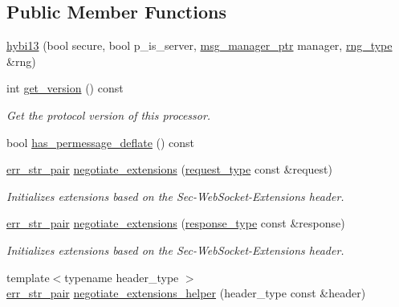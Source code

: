 \subsection*{Public Member Functions}
\begin{DoxyCompactItemize}
\item 
\hyperlink{classwebsocketpp_1_1processor_1_1hybi13_af07830f45e2733bd75db70fe951416cf}{hybi13} (bool secure, bool p\+\_\+is\+\_\+server, \hyperlink{classwebsocketpp_1_1processor_1_1hybi13_a435c6586650330e0f1685da6b4e70a68}{msg\+\_\+manager\+\_\+ptr} manager, \hyperlink{classwebsocketpp_1_1processor_1_1hybi13_ad6e55eeed8ec7329fb71abceb4159a5c}{rng\+\_\+type} \&rng)
\item 
int \hyperlink{classwebsocketpp_1_1processor_1_1hybi13_a1be776d87eb3aa0ce4512994f1c0e53a}{get\+\_\+version} () const 
\begin{DoxyCompactList}\small\item\em Get the protocol version of this processor. \end{DoxyCompactList}\item 
bool \hyperlink{classwebsocketpp_1_1processor_1_1hybi13_a78dc525e6e8b38b1b9caba3ec4e42a63}{has\+\_\+permessage\+\_\+deflate} () const 
\item 
\hyperlink{classwebsocketpp_1_1processor_1_1hybi13_a1ebac644e40640950b65782ccc39a33a}{err\+\_\+str\+\_\+pair} \hyperlink{classwebsocketpp_1_1processor_1_1hybi13_aee995e6a4a29a800ce3b031885814ed1}{negotiate\+\_\+extensions} (\hyperlink{classwebsocketpp_1_1processor_1_1hybi13_aaf7438e06dfb60da29ef201f8c8cf2dd}{request\+\_\+type} const \&request)
\begin{DoxyCompactList}\small\item\em Initializes extensions based on the Sec-\/\+Web\+Socket-\/\+Extensions header. \end{DoxyCompactList}\item 
\hyperlink{classwebsocketpp_1_1processor_1_1hybi13_a1ebac644e40640950b65782ccc39a33a}{err\+\_\+str\+\_\+pair} \hyperlink{classwebsocketpp_1_1processor_1_1hybi13_a5b01c6303142aa151cf9bf1fe9ccb6e3}{negotiate\+\_\+extensions} (\hyperlink{classwebsocketpp_1_1processor_1_1hybi13_a5d918ca9c9aa6c38a145f2ef1d2aa38a}{response\+\_\+type} const \&response)
\begin{DoxyCompactList}\small\item\em Initializes extensions based on the Sec-\/\+Web\+Socket-\/\+Extensions header. \end{DoxyCompactList}\item 
{\footnotesize template$<$typename header\+\_\+type $>$ }\\\hyperlink{classwebsocketpp_1_1processor_1_1hybi13_a1ebac644e40640950b65782ccc39a33a}{err\+\_\+str\+\_\+pair} \hyperlink{classwebsocketpp_1_1processor_1_1hybi13_a2bba499a185aa0219c2389532a332393}{negotiate\+\_\+extensions\+\_\+helper} (header\+\_\+type const \&header)

\end{DoxyCompactItemize}
